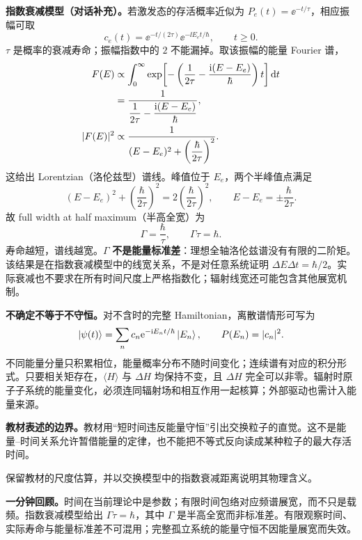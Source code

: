 \textbf{指数衰减模型（对话补充）。}若激发态的存活概率近似为 $P_e(t)=\ee^{-t/\tau}$，相应振幅可取
\begin{equation}
  c_e(t)=\ee^{-t/(2\tau)}\ee^{-\ii E_et/\hbar},\qquad t\ge0.
\end{equation}
$\tau$ 是概率的衰减寿命；振幅指数中的 $2$ 不能漏掉。取该振幅的能量 Fourier 谱，
\begin{align}
  F(E)&\propto\int_0^\infty
    \exp\!\left[-\left(\frac1{2\tau}
    -\frac{\mathrm{i}(E-E_e)}\hbar\right)t\right]\mathop{}\!\mathrm{d} t\notag\\
   &=\frac1{\dfrac1{2\tau}-\dfrac{\mathrm{i}(E-E_e)}\hbar},\\
  |F(E)|^2&\propto
    \frac1{(E-E_e)^2+\left(\dfrac\hbar{2\tau}\right)^2}.
\end{align}
这给出 Lorentzian（洛伦兹型）谱线。峰值位于 $E_e$，两个半峰值点满足
\begin{equation}
  (E-E_e)^2+\left(\frac\hbar{2\tau}\right)^2
     =2\left(\frac\hbar{2\tau}\right)^2,
  \qquad E-E_e=\pm\frac\hbar{2\tau}.
\end{equation}
故 full width at half maximum（半高全宽）为
\begin{equation}
  \boxed{\Gamma=\frac\hbar\tau,\qquad\Gamma\tau=\hbar}.
\end{equation}
寿命越短，谱线越宽。$\Gamma$ \textbf{不是能量标准差}：理想全轴洛伦兹谱没有有限的二阶矩。该结果是在指数衰减模型中的线宽关系，不是对任意系统证明 $\Delta E\Delta t=\hbar/2$。实际衰减也不要求在所有时间尺度上严格指数化；辐射线宽还可能包含其他展宽机制。

\textbf{不确定不等于不守恒。}对不含时的完整 Hamiltonian，离散谱情形可写为
\begin{equation}
  \left|\psi(t)\right\rangle=\sum_n c_n\mathrm{e}^{-\mathrm{i} E_nt/\hbar}\left|E_n\right\rangle,
  \qquad P(E_n)=|c_n|^2.
\end{equation}
不同能量分量只积累相位，能量概率分布不随时间变化；连续谱有对应的积分形式。只要相关矩存在，$\langle H\rangle$ 与 $\Delta H$ 均保持不变，且 $\Delta H$ 完全可以非零。辐射时原子子系统的能量变化，必须连同辐射场和相互作用一起核算；外部驱动也需计入能量来源。

\textbf{教材表述的边界。}教材用“短时间违反能量守恒”引出交换粒子的直觉。这不是能量--时间关系允许暂借能量的定律，也不能把不等式反向读成某种粒子的最大存活时间。

 保留教材的尺度估算，并以交换模型中的指数衰减距离说明其物理含义。

\textbf{一分钟回顾。}时间在当前理论中是参数；有限时间包络对应频谱展宽，而不只是载频。指数衰减模型给出 $\Gamma\tau=\hbar$，其中 $\Gamma$ 是半高全宽而非标准差。有限观察时间、实际寿命与能量标准差不可混用；完整孤立系统的能量守恒不因能量展宽而失效。
